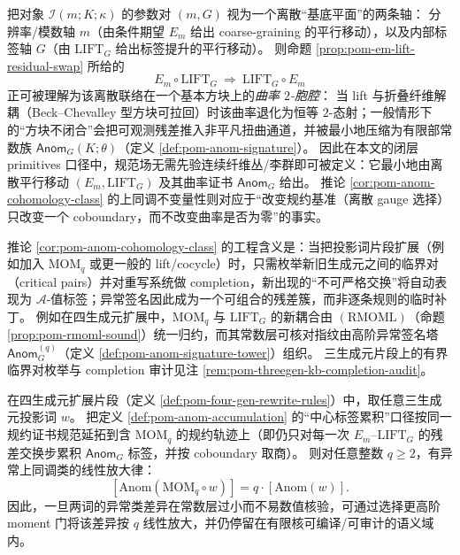 \begin{remark}\label{rem:pom-anom-as-curvature}
把对象 \(\mathcal{I}(m;K;\kappa)\) 的参数对 \((m,G)\) 视为一个离散“基底平面”的两条轴：
分辨率/模数轴 \(m\)（由条件期望 \(E_m\) 给出 coarse-graining 的平行移动），以及内部标签轴 \(G\)（由 \(\mathrm{LIFT}_G\) 给出标签提升的平行移动）。
则命题 \ref{prop:pom-em-lift-residual-swap} 所给的
\[
E_m\circ \mathrm{LIFT}_G\ \Rightarrow\ \mathrm{LIFT}_G\circ E_m
\]
正可被理解为该离散联络在一个基本方块上的\emph{曲率 \(2\)-胞腔}：
当 lift 与折叠纤维解耦（Beck--Chevalley 型方块可拉回）时该曲率退化为恒等 \(2\)-态射；一般情形下的“方块不闭合”会把可观测残差推入非平凡扭曲通道，并被最小地压缩为有限部常数族 \(\mathsf{Anom}_G(K;\theta)\)（定义 \ref{def:pom-anom-signature}）。
因此在本文的闭层 primitives 口径中，规范场无需先验连续纤维丛/李群即可被定义：它最小地由离散平行移动 \((E_m,\mathrm{LIFT}_G)\) 及其曲率证书 \(\mathsf{Anom}_G\) 给出。
推论 \ref{cor:pom-anom-cohomology-class} 的上同调不变量性则对应于“改变规约基准（离散 gauge 选择）只改变一个 coboundary，而不改变曲率是否为零”的事实。
\end{remark}

\begin{remark}\label{rem:pom-anom-completion}
推论 \ref{cor:pom-anom-cohomology-class} 的工程含义是：当把投影词片段扩展（例如加入 \(\mathrm{MOM}_q\) 或更一般的 lift/cocycle）时，只需枚举新旧生成元之间的临界对（critical pairs）并对重写系统做 completion，新出现的“不可严格交换”将自动表现为 \(\mathcal{A}\)-值标签；异常签名因此成为一个可组合的残差簇，而非逐条规则的临时补丁。
例如在四生成元扩展中，\(\mathrm{MOM}_q\) 与 \(\mathrm{LIFT}_G\) 的新耦合由 \((\mathrm{RMOML})\)（命题 \ref{prop:pom-rmoml-sound}）统一归约，而其常数层可核对指纹由高阶异常签名塔 \(\mathsf{Anom}^{(q)}_G\)（定义 \ref{def:pom-anom-signature-tower}）组织。
三生成元片段上的有界临界对枚举与 completion 审计见注 \ref{rem:pom-threegen-kb-completion-audit}。
\end{remark}

\begin{proposition}\label{prop:pom-anom-moment-amplification}
在四生成元扩展片段（定义 \ref{def:pom-four-gen-rewrite-rules}）中，取任意三生成元投影词 \(w\)。
把定义 \ref{def:pom-anom-accumulation} 的“中心标签累积”口径按同一规约证书规范延拓到含 \(\mathrm{MOM}_q\) 的规约轨迹上（即仍只对每一次 \(E_m\)--\(\mathrm{LIFT}_G\) 的残差交换步累积 \(\mathsf{Anom}_G\) 标签，并按 coboundary 取商）。
则对任意整数 \(q\ge 2\)，有异常上同调类的线性放大律：
\[
\boxed{\;
[\mathrm{Anom}(\mathrm{MOM}_q\circ w)]
=
q\cdot [\mathrm{Anom}(w)].\;}
\]
因此，一旦两词的异常类差异在常数层过小而不易数值核验，可通过选择更高阶 moment 门将该差异按 \(q\) 线性放大，并仍停留在有限核可编译/可审计的语义域内。
\end{proposition}

